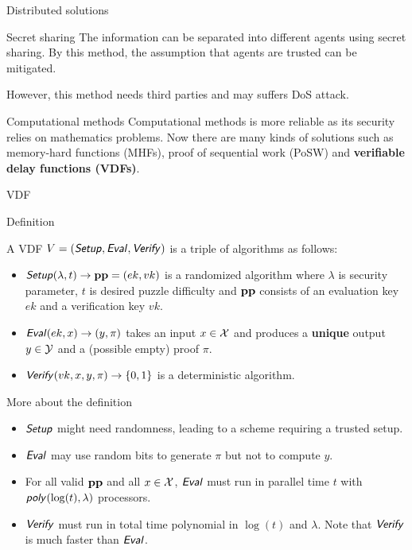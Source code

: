 \documentclass[UTF8]{beamer}
\begin{document}
	\begin{frame}{Distributed solutions}
		\begin{block}{Secret sharing}
			The information can be separated into different agents using secret sharing. By this method, the assumption that agents are trusted can be mitigated.
			
			However, this method needs third parties and may suffers DoS attack.
		\end{block}
		\begin{block}{Computational methods}
			Computational methods is more reliable as its security relies on mathematics problems. Now there are many kinds of solutions such as memory-hard functions (MHFs), proof of sequential work (PoSW) and \textbf{verifiable delay functions (VDFs)}.
		\end{block}
	\end{frame}
	\begin{frame}
		\centering
		\huge VDF
	\end{frame}
	\begin{frame}{Definition}
		\begin{block}{}
			A VDF $V=(\textsf{\textit{Setup}},\textsf{\textit{Eval}},\textsf{\textit{Verify}})$ is a triple of algorithms as follows:
			\begin{itemize}
				\item $\textsf{\textit{Setup}}(\lambda, t)\to\mathbf{pp}=(ek,vk)$ is a randomized algorithm where $\lambda$ is security parameter, $t$ is desired puzzle difficulty and $\mathbf{pp}$ consists of an evaluation key $ek$ and a verification key $vk$.
				\item $\textsf{\textit{Eval}}(ek,x)\to(y,\pi)$ takes an input $x\in\mathcal{X}$ and produces a \textbf{unique} output $y\in\mathcal{Y}$ and a (possible empty) proof $\pi$.
				\item $\textsf{\textit{Verify}}(vk,x,y,\pi)\to\{0,1\}$ is a deterministic algorithm.
			\end{itemize}
		\end{block}
	\end{frame}
	\begin{frame}{More about the definition}
		\begin{block}{}
			\begin{itemize}
				\item $\textsf{\textit{Setup}}$ might need randomness, leading to a scheme requiring a trusted setup.
				\item $\textsf{\textit{Eval}}$ may use random bits to generate $\pi$ but not to compute $y$.
				\item For all valid $\mathbf{pp}$ and all $x\in\mathcal{X}$, $\textsf{\textit{Eval}}$ must run in parallel time $t$ with $\textsf{\textit{poly}}(\log(t),\lambda)$ processors.
				\item $\textsf{\textit{Verify}}$ must run in total time polynomial in $\log(t)$ and $\lambda$. Note that $\textsf{\textit{Verify}}$ is much faster than $\textsf{\textit{Eval}}$.
			\end{itemize}
		\end{block}
	\end{frame}
\end{document}
